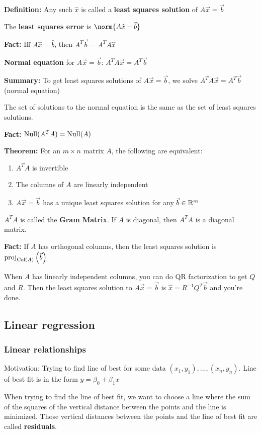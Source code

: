 \textbf{Definition:} Any such $\hat x$ is called a \textbf{least squares solution} of $A\Vec x = \Vec b$

The \textbf{least squares error} is $\norm{A\hat x - \Vec b}$

\textbf{Fact:} Iff $A\hat x = \hat b$, then $A^T\Vec b = A^TA\hat x$

\textbf{Normal equation} for $A\Vec x = \Vec b$: $A^TA\Vec x = A^T\Vec b$

\textbf{Summary:} To get least squares solutions of $A\Vec x = \Vec b$, we solve $A^TA\Vec x = A^T\Vec b$ (normal equation)

The set of solutions to the normal equation is the same as the set of least squares solutions.

\textbf{Fact:} $\operatorname{Null}(A^TA) = \operatorname{Null}(A)$

\textbf{Theorem:} For an $m \times n$ matrix $A$, the following are equivalent:
\begin{enumerate}
    \item $A^TA$ is invertible
    \item The columns of $A$ are linearly independent
    \item $A\Vec x = \Vec b$ has a unique least squares solution for any $\Vec b \in \mathbb{R}^m$
\end{enumerate}

$A^TA$ is called the \textbf{Gram Matrix}. If $A$ is diagonal, then $A^TA$ is a diagonal matrix.

\textbf{Fact:} If $A$ has orthogonal columns, then the least squares solution is $\mathrm{proj}_{\operatorname{Col}(A)}\left(\Vec b\right)$

When $A$ has linearly independent columns, you can do QR factorization to get $Q$ and $R$. Then the least squares solution to $A\Vec x = \Vec b$ is $\hat x = R^{-1}Q^T\Vec{b}$ and you're done.

\subsection{Linear regression}

\subsubsection*{Linear relationships}

Motivation: Trying to find line of best for some data $(x_1, y_1), ..., (x_n, y_n)$. Line of best fit is in the form $y = \beta_0 + \beta_1 x$

When trying to find the line of best fit, we want to choose a line where the sum of the squares of the vertical distance between the points and the line is minimized. Those vertical distances between the points and the line of best fit are called \textbf{residuals}.

